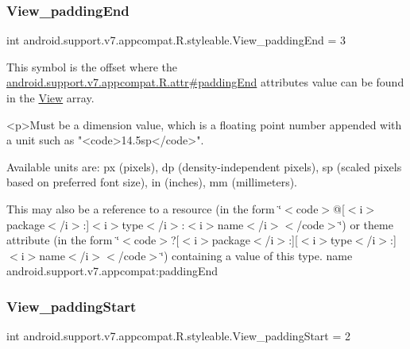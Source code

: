 \subsubsection{\texorpdfstring{View\+\_\+padding\+End}{View\_paddingEnd}}
{\footnotesize\ttfamily int android.\+support.\+v7.\+appcompat.\+R.\+styleable.\+View\+\_\+padding\+End = 3\hspace{0.3cm}{\ttfamily [static]}}

This symbol is the offset where the \hyperlink{classandroid_1_1support_1_1v7_1_1appcompat_1_1R_1_1attr_a53f8fb182350de961ffa4ba1b786cb3a}{android.\+support.\+v7.\+appcompat.\+R.\+attr\#padding\+End} attribute\textquotesingle{}s value can be found in the \hyperlink{classandroid_1_1support_1_1v7_1_1appcompat_1_1R_1_1styleable_a0105bc03f2606ae1fc5f05a515d81b3c}{View} array.

\begin{DoxyVerb}      <p>Must be a dimension value, which is a floating point number appended with a unit such as "<code>14.5sp</code>".
\end{DoxyVerb}
 Available units are\+: px (pixels), dp (density-\/independent pixels), sp (scaled pixels based on preferred font size), in (inches), mm (millimeters). 

This may also be a reference to a resource (in the form \char`\"{}$<$code$>$@\mbox{[}$<$i$>$package$<$/i$>$\+:\mbox{]}$<$i$>$type$<$/i$>$\+:$<$i$>$name$<$/i$>$$<$/code$>$\char`\"{}) or theme attribute (in the form \char`\"{}$<$code$>$?\mbox{[}$<$i$>$package$<$/i$>$\+:\mbox{]}\mbox{[}$<$i$>$type$<$/i$>$\+:\mbox{]}$<$i$>$name$<$/i$>$$<$/code$>$\char`\"{}) containing a value of this type.  name android.\+support.\+v7.\+appcompat\+:padding\+End \mbox{\label{classandroid_1_1support_1_1v7_1_1appcompat_1_1R_1_1styleable_a6a45d688c5e562564bd4ea8e8a8009da}} 
\subsubsection{\texorpdfstring{View\+\_\+padding\+Start}{View\_paddingStart}}
{\footnotesize\ttfamily int android.\+support.\+v7.\+appcompat.\+R.\+styleable.\+View\+\_\+padding\+Start = 2\hspace{0.3cm}{\ttfamily [static]}}

